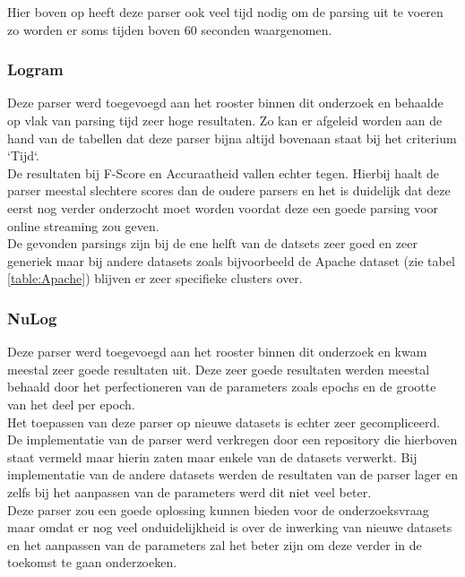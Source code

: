 Hier boven op heeft deze parser ook veel tijd nodig om de parsing uit te voeren zo worden er soms tijden boven 60 seconden waargenomen.

\subsubsection{Logram}
Deze parser werd toegevoegd aan het rooster binnen dit onderzoek en behaalde op vlak van parsing tijd zeer hoge resultaten. Zo kan er afgeleid worden aan de hand van de tabellen dat deze parser bijna altijd bovenaan staat bij het criterium `Tijd`.\\

De resultaten bij F-Score en Accuraatheid vallen echter tegen. Hierbij haalt de parser meestal slechtere scores dan de oudere parsers en het is duidelijk dat deze eerst nog verder onderzocht moet worden voordat deze een goede parsing voor online streaming zou geven.\\

De gevonden parsings zijn bij de ene helft van de datsets zeer goed en zeer generiek maar bij andere datasets zoals bijvoorbeeld de Apache dataset (zie tabel \ref{table:Apache}) blijven er zeer specifieke clusters over.

\subsubsection{NuLog}
Deze parser werd toegevoegd aan het rooster binnen dit onderzoek en kwam meestal zeer goede resultaten uit. Deze zeer goede resultaten werden meestal behaald door het perfectioneren van de parameters zoals epochs en de grootte van het deel per epoch.\\

Het toepassen van deze parser op nieuwe datasets is echter zeer gecompliceerd. De implementatie van de parser werd verkregen door een repository die hierboven staat vermeld maar hierin zaten maar enkele van de datasets verwerkt. Bij implementatie van de andere datasets werden de resultaten van de parser lager en zelfs bij het aanpassen van de parameters werd dit niet veel beter.\\

Deze parser zou een goede oplossing kunnen bieden voor de onderzoeksvraag maar omdat er nog veel onduidelijkheid is over de inwerking van nieuwe datasets en het aanpassen van de parameters zal het beter zijn om deze verder in de toekomst te gaan onderzoeken.

